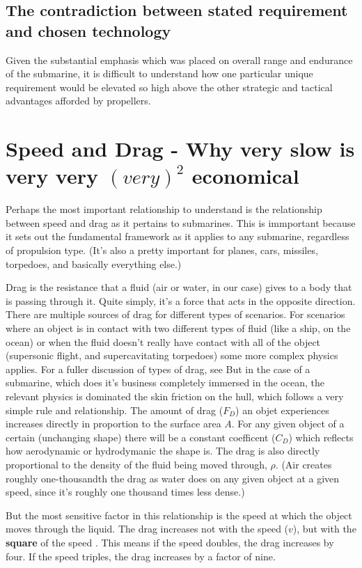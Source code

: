 \documentclass{article}\usepackage[]{graphicx}\usepackage[]{color}
\begin{document}
\subsection{The contradiction between stated requirement and chosen technology}
Given the substantial emphasis which was placed on overall range and endurance of the submarine, it is difficult to understand how one particular unique requirement would be elevated so high above the other strategic and tactical advantages afforded by propellers.

\section{Speed and Drag - Why very slow is very very $(very)^2$ economical}

Perhaps the most important relationship to understand is the relationship between speed and drag as it pertains to submarines.  This is immportant because it sets out the fundamental framework as it applies to any submarine, regardless of propulsion type.  (It's also a pretty important for planes, cars, missiles, torpedoes, and basically everything else.)

Drag is the resistance that a fluid (air or water, in our case) gives to a body that is passing through it. Quite simply, it's a force that acts in the opposite direction.  There are multiple sources of drag for different types of scenarios.  For scenarios where an object is in contact with two different types of fluid (like a ship, on the ocean) or when the fluid doesn't really have contact with all of the object (supersonic flight, and supercavitating torpedoes) some more complex physics applies. For a fuller discussion of types of drag, see \cite{carlton2007}  But in the case of a submarine, which does it's business completely immersed in the ocean, the relevant physics is dominated the skin friction on the hull, which follows a very simple rule and relationship.  The amount of drag ($F_D$) an objet experiences increases directly in proportion to the surface area $A$.  For any given object of a certain (unchanging shape) there will be a constant coefficent ($C_D$) which reflects how aerodynamic or hydrodymanic the shape is.  The drag is also directly proportional to the density of the fluid being moved through, $\rho$.  (Air creates roughly one-thousandth the drag as water does on any given object at a given speed, since it's roughly one thousand times less dense.)

But the most sensitive factor in this relationship is the speed at which the object moves through the liquid.  The drag increases not with the speed ($v$), but with the \textbf{square} of the speed . This means if the speed doubles, the drag increases by four.  If the speed triples, the drag increases by a factor of nine.
\end{document}
